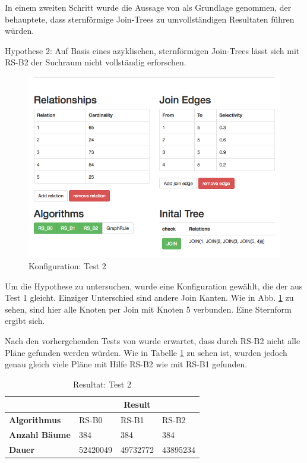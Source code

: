 In einem zweiten Schritt wurde die Aussage von \cite{shanbhag2014optimizing} als Grundlage genommen, der behauptete, dass sternförmige Join-Trees zu umvollständigen Resultaten führen würden.

Hypothese 2: Auf Basis eines azyklischen, sternförmigen Join-Trees lässt sich mit RS-B2 der Suchraum nicht vollständig erforschen.

\begin{figure}[ht]
  \centering
  \includegraphics[width=\textwidth]{05_ResultsEvaluation/00_media/Test2.png}
  \caption{Konfiguration: Test 2}
  \label{Konfiguration:Test2}
\end{figure}


Um die Hypothese zu untersuchen, wurde eine Konfiguration gewählt, die der aus Test 1 gleicht. Einziger Unterschied sind andere Join Kanten. Wie in  Abb. \ref{Konfiguration:Test2} zu sehen, sind hier alle Knoten per Join mit Knoten 5 verbunden. Eine Sternform ergibt sich.

Nach den vorhergehenden Tests von \cite{shanbhag2014optimizing} wurde erwartet, dass durch RS-B2 nicht alle Pläne gefunden werden würden. Wie in Tabelle \ref{Result:Test2} zu sehen ist, wurden jedoch genau gleich viele Pläne mit Hilfe RS-B2 wie mit RS-B1 gefunden. 

\begin{table}[h]
\centering

\begin{tabular}{|l|l|l|l|}
\hline
                         & \multicolumn{3}{c|}{{\bf Result}} \\ \hline
{\bf Algorithmus}        & RS-B0     & RS-B1     & RS-B2     \\ \hline
{\bf Anzahl Bäume}       & 384       & 384       & 384       \\ \hline
{\bf Dauer}              & 52420049  & 49732772  & 43895234  \\ \hline
\end{tabular}

\caption{Resultat: Test 2}
\label{Result:Test2}
\end{table}


